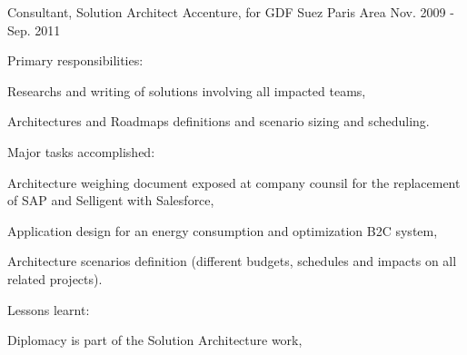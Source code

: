 \begin{cventries}
  \cventry
    {Consultant, Solution Architect} %
    {Accenture, for GDF Suez} %
    {Paris Area} %
    {Nov. 2009 - Sep. 2011} %
    {
      \begin{cvitems} %
        \item {Primary responsibilities:}
        \begin{cvsubitems}
          \item {Researchs and writing of solutions involving all impacted teams,}
          \item {Architectures and Roadmaps definitions and scenario sizing and scheduling.}
        \end{cvsubitems}
        \item {Major tasks accomplished:}
        \begin{cvsubitems}
          \item {Architecture weighing document exposed at company counsil for the replacement of SAP and Selligent with Salesforce,}
          \item {Application design for an energy consumption and optimization B2C system,}
          \item {Architecture scenarios definition (different budgets, schedules and impacts on all related projects).}
        \end{cvsubitems}
        \item {Lessons learnt:}
        \begin{cvsubitems}
          \item {Diplomacy is part of the Solution Architecture work,}
        \end{cvsubitems}
      \end{cvitems}
    }


\end{cventries}
